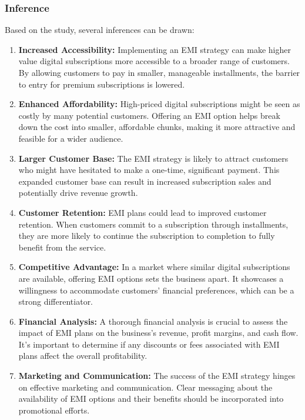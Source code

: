 \subsubsection{Inference}
Based on the study, several inferences can be drawn:

\begin{enumerate}
    \item \textbf{Increased Accessibility:} Implementing an EMI strategy can make higher value digital subscriptions more accessible to a broader range of customers. By allowing customers to pay in smaller, manageable installments, the barrier to entry for premium subscriptions is lowered.

    \item \textbf{Enhanced Affordability:} High-priced digital subscriptions might be seen as costly by many potential customers. Offering an EMI option helps break down the cost into smaller, affordable chunks, making it more attractive and feasible for a wider audience.

    \item \textbf{Larger Customer Base:} The EMI strategy is likely to attract customers who might have hesitated to make a one-time, significant payment. This expanded customer base can result in increased subscription sales and potentially drive revenue growth.

    \item \textbf{Customer Retention:} EMI plans could lead to improved customer retention. When customers commit to a subscription through installments, they are more likely to continue the subscription to completion to fully benefit from the service.

    \item \textbf{Competitive Advantage:} In a market where similar digital subscriptions are available, offering EMI options sets the business apart. It showcases a willingness to accommodate customers' financial preferences, which can be a strong differentiator.

    \item \textbf{Financial Analysis:} A thorough financial analysis is crucial to assess the impact of EMI plans on the business's revenue, profit margins, and cash flow. It's important to determine if any discounts or fees associated with EMI plans affect the overall profitability.

    \item \textbf{Marketing and Communication:} The success of the EMI strategy hinges on effective marketing and communication. Clear messaging about the availability of EMI options and their benefits should be incorporated into promotional efforts.


\end{enumerate}
